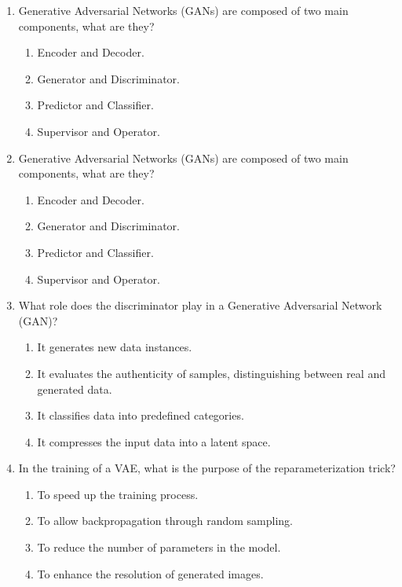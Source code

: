 \documentclass{report}
\numberwithin{equation}{section}
\begin{document}
\begin{enumerate}
\item Generative Adversarial Networks (GANs) are composed of two main components, what are they?
\begin{enumerate}[label=\alph*.]
    \item Encoder and Decoder.
    \item Generator and Discriminator.
    \item Predictor and Classifier.
    \item Supervisor and Operator.
\end{enumerate}
\item Generative Adversarial Networks (GANs) are composed of two main components, what are they?
\begin{enumerate}[label=\alph*.]
    \item Encoder and Decoder.
    \item Generator and Discriminator.
    \item Predictor and Classifier.
    \item Supervisor and Operator.
\end{enumerate}

\item What role does the discriminator play in a Generative Adversarial Network (GAN)?
\begin{enumerate}[label=\alph*.]
    \item It generates new data instances.
    \item It evaluates the authenticity of samples, distinguishing between real and generated data.
    \item It classifies data into predefined categories.
    \item It compresses the input data into a latent space.
\end{enumerate}

\item In the training of a VAE, what is the purpose of the reparameterization trick?
\begin{enumerate}[label=\alph*.]
    \item To speed up the training process.
    \item To allow backpropagation through random sampling.
    \item To reduce the number of parameters in the model.
    \item To enhance the resolution of generated images.
\end{enumerate}


\end{enumerate}
\end{document}
